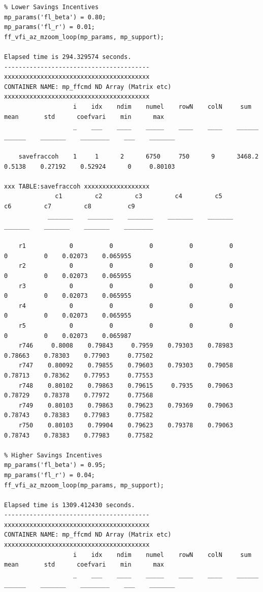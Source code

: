 \documentclass[
]{book}
\begin{document}
\begin{verbatim}
% Lower Savings Incentives
mp_params('fl_beta') = 0.80;
mp_params('fl_r') = 0.01;
ff_vfi_az_mzoom_loop(mp_params, mp_support);

Elapsed time is 294.329574 seconds.
----------------------------------------
xxxxxxxxxxxxxxxxxxxxxxxxxxxxxxxxxxxxxxxx
CONTAINER NAME: mp_ffcmd ND Array (Matrix etc)
xxxxxxxxxxxxxxxxxxxxxxxxxxxxxxxxxxxxxxxx
                   i    idx    ndim    numel    rowN    colN     sum       mean       std      coefvari    min      max  
                   _    ___    ____    _____    ____    ____    ______    ______    _______    ________    ___    _______

    savefraccoh    1     1      2      6750     750      9      3468.2    0.5138    0.27192    0.52924      0     0.80103

xxx TABLE:savefraccoh xxxxxxxxxxxxxxxxxx
              c1         c2         c3         c4         c5         c6         c7         c8          c9   
            _______    _______    _______    _______    _______    _______    _______    _______    ________

    r1            0          0          0          0          0          0          0    0.02073    0.065955
    r2            0          0          0          0          0          0          0    0.02073    0.065955
    r3            0          0          0          0          0          0          0    0.02073    0.065955
    r4            0          0          0          0          0          0          0    0.02073    0.065955
    r5            0          0          0          0          0          0          0    0.02073    0.065987
    r746     0.8008    0.79843     0.7959    0.79303    0.78983    0.78663    0.78303    0.77903     0.77502
    r747    0.80092    0.79855    0.79603    0.79303    0.79058    0.78713    0.78362    0.77953     0.77553
    r748    0.80102    0.79863    0.79615     0.7935    0.79063    0.78729    0.78378    0.77972     0.77568
    r749    0.80103    0.79863    0.79623    0.79369    0.79063    0.78743    0.78383    0.77983     0.77582
    r750    0.80103    0.79904    0.79623    0.79378    0.79063    0.78743    0.78383    0.77983     0.77582

% Higher Savings Incentives
mp_params('fl_beta') = 0.95;
mp_params('fl_r') = 0.04;
ff_vfi_az_mzoom_loop(mp_params, mp_support);

Elapsed time is 1309.412430 seconds.
----------------------------------------
xxxxxxxxxxxxxxxxxxxxxxxxxxxxxxxxxxxxxxxx
CONTAINER NAME: mp_ffcmd ND Array (Matrix etc)
xxxxxxxxxxxxxxxxxxxxxxxxxxxxxxxxxxxxxxxx
                   i    idx    ndim    numel    rowN    colN     sum       mean       std      coefvari    min      max  
                   _    ___    ____    _____    ____    ____    ______    ______    _______    ________    ___    _______


\end{verbatim}
\end{document}

